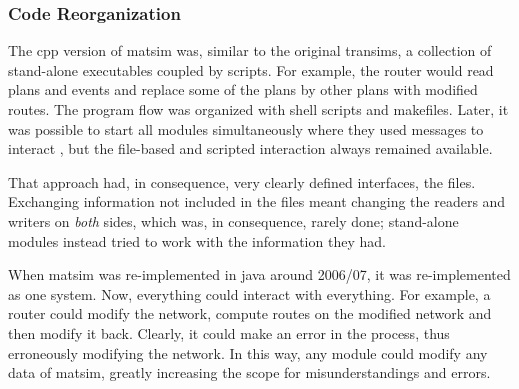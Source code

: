 

%


\subsubsection{Code Reorganization}
\label{sec:matsim-core-reorg}
The \gls{cpp} version of \gls{matsim} was, similar to the original \gls{transims}, a collection of stand-alone executables coupled by scripts.  For example, the router would read plans and events and replace some of the plans by other plans with modified routes.  The program flow was organized with shell scripts and makefiles.  Later, it was possible to start all modules simultaneously where they used messages to interact \citep[also see][]{GloorNagel2005ped-att04-birkh}, but the file-based and scripted interaction always remained available.

That approach had, in consequence, very clearly defined interfaces, \ie the files. Exchanging information not included in the files meant changing the readers and writers on \emph{both} sides, which was, in consequence, rarely done; stand-alone modules instead tried to work with the information they had.

When \gls{matsim} was re-implemented in \gls{java} around 2006/07, it was re-implemented as one system. Now, everything could interact with everything.  For example, a router could modify the network, compute routes on the modified network and then modify it back. Clearly, it could make an error in the process, thus erroneously modifying the network. In this way, any module could modify any data of \gls{matsim}, greatly increasing the scope for misunderstandings and errors.

